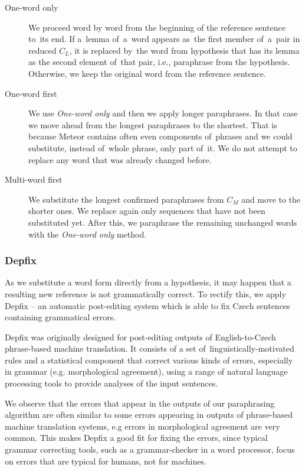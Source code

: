 \documentclass[11pt]{article}
\begin{document}
\begin{description}
\item[One-word only] We proceed word by word from the beginning of the reference 
sentence to~its end. If a~lemma of~a~word appears as~the first member of~a~pair 
in reduced $ C_{L} $, it is replaced by~the word from hypothesis that has its lemma
as the second element of~that pair, i.e., paraphrase from the hypothesis. Otherwise, 
we keep the original word from the reference sentence.
\item[One-word first] We use \textit{One-word only} and then we apply longer paraphrases.
In that case we move ahead from the longest paraphrases to the shortest. That is because 
Meteor contains often even components of~phrases and we could substitute, instead of~whole 
phrase, only part of~it. We do not attempt to replace any word that was already changed 
before.
\item[Multi-word first] We substitute the longest confirmed paraphrases from
$ C_{M} $ and move to the shorter ones. We replace again only sequences that have not
been substituted yet. After this, we paraphrase the remaining unchanged words
with the \textit{One-word only} method.
\end{description}

\subsubsection{Depfix}
As we substitute a word form directly from a hypothesis, it may happen that a resulting
new reference is not grammatically correct. To rectify this, we apply Depfix \cite{depfix} 
-- an automatic post-editing system which is able to fix Czech sentences containing 
grammatical errors.

Depfix was originally designed for post-editing outputs of English-to-Czech 
phrase-based machine translation. It consists of a set of~linguistically-motivated rules 
and a statistical component that correct various kinds of errors, especially in grammar 
(e.g. morphological agreement), using a range of natural language processing tools to 
provide analyses of the input sentences.

We observe that the errors that appear in the outputs of our paraphrasing algorithm are 
often similar to some errors appearing in outputs of phrase-based machine translation systems, 
e.g errors in morphological agreement are very common. This makes Depfix a good fit for fixing 
the errors, since typical grammar correcting tools, such as a grammar-checker in a word processor, 
focus on errors that are typical for humans, not for machines. 
\end{document}
